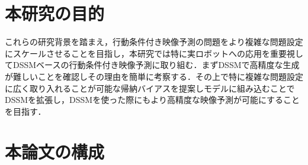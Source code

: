 \section{本研究の目的}

これらの研究背景を踏まえ，行動条件付き映像予測の問題をより複雑な問題設定にスケールさせることを目指し，本研究では特に実ロボットへの応用を重要視してDSSMベースの行動条件付き映像予測に取り組む．まずDSSMで高精度な生成が難しいことを確認しその理由を簡単に考察する．その上で特に複雑な問題設定に広く取り入れることが可能な帰納バイアスを提案しモデルに組み込むことでDSSMを拡張し，DSSMを使った際にもより高精度な映像予測が可能にすることを目指す．

\section{本論文の構成}








